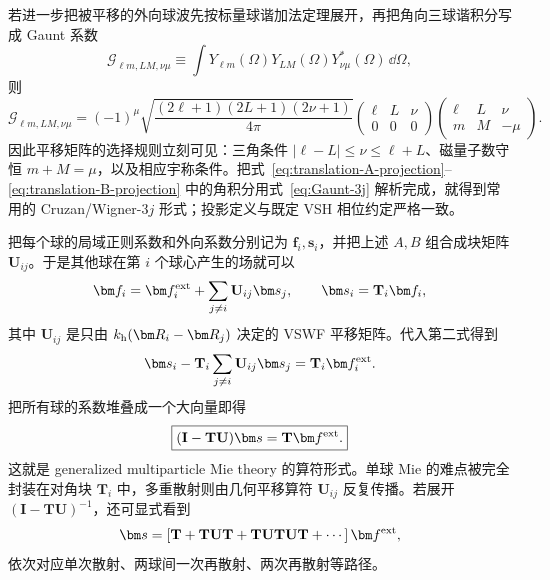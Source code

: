 若进一步把被平移的外向球波先按标量球谐加法定理展开，再把角向三球谐积分写成 Gaunt 系数
\begin{equation}
\mathcal G_{\ell m,LM,\nu\mu}
\equiv
\int Y_{\ell m}(\Omega)
Y_{LM}(\Omega)
Y_{\nu\mu}^*(\Omega)\,\dd\Omega,
\end{equation}
则
\begin{equation}
\mathcal G_{\ell m,LM,\nu\mu}
=(-1)^\mu
\sqrt{\frac{(2\ell+1)(2L+1)(2\nu+1)}{4\pi}}
\begin{pmatrix}\ell&L&\nu\\0&0&0\end{pmatrix}
\begin{pmatrix}\ell&L&\nu\\m&M&-\mu\end{pmatrix}.
\label{eq:Gaunt-3j}
\end{equation}
因此平移矩阵的选择规则立刻可见：三角条件
$|\ell-L|\le\nu\le\ell+L$、磁量子数守恒
$m+M=\mu$，以及相应宇称条件。把式~\eqref{eq:translation-A-projection}--\eqref{eq:translation-B-projection} 中的角积分用式~\eqref{eq:Gaunt-3j} 解析完成，就得到常用的 Cruzan/Wigner-$3j$ 形式；投影定义与既定 VSH 相位约定严格一致。

把每个球的局域正则系数和外向系数分别记为 $\bm f_i,\bm s_i$，并把上述 $A,B$ 组合成块矩阵 $\mathbf U_{ij}$。于是其他球在第 $i$ 个球心产生的场就可以
\begin{equation}
\bm f_i
=\bm f_i^{\rm ext}
+\sum_{j\ne i}\mathbf U_{ij}\bm s_j,
\qquad
\bm s_i=\mathbf T_i\bm f_i,
\label{eq:multiple-mie-local}
\end{equation}
其中 $\mathbf U_{ij}$ 是只由
$k_{\rm h}(\bm R_i-\bm R_j)$ 决定的 VSWF 平移矩阵。代入第二式得到
\begin{equation}
\bm s_i
-\mathbf T_i\sum_{j\ne i}\mathbf U_{ij}\bm s_j
=\mathbf T_i\bm f_i^{\rm ext}.
\end{equation}
把所有球的系数堆叠成一个大向量即得
\begin{equation}
\boxed{
(\mathbf I-\mathbf T\mathbf U)\bm s
=\mathbf T\bm f^{\rm ext}.}
\label{eq:multiple-mie-global}
\end{equation}
这就是 generalized multiparticle Mie theory 的算符形式。单球 Mie 的难点被完全封装在对角块
$\mathbf T_i$ 中，多重散射则由几何平移算符
$\mathbf U_{ij}$ 反复传播。若展开
$(\mathbf I-\mathbf T\mathbf U)^{-1}$，还可显式看到
\begin{equation}
\bm s
=\left[
\mathbf T
+\mathbf T\mathbf U\mathbf T
+\mathbf T\mathbf U\mathbf T\mathbf U\mathbf T
+\cdots
\right]\bm f^{\rm ext},
\end{equation}
依次对应单次散射、两球间一次再散射、两次再散射等路径。


